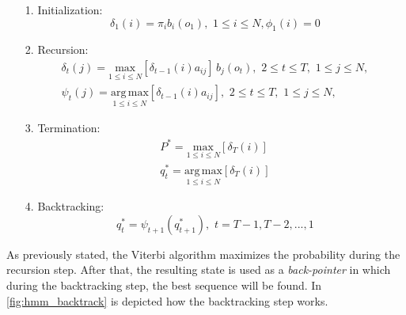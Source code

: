 \begin{itemize}
	\item[1.]{Initialization:} \\
	\begin{equation}
		\delta_{1}(i) = \pi_{i}b_{i}(o_{1}), \,\, 1 \leq i \leq N, \phi_{1}(i) = 0
	\end{equation}		

	\item[2.]{Recursion:} \\
	\begin{subequations}
		\begin{align}
		\delta_{t}(j) = \underset{1\leq i \leq N}{\mathrm{max}} [\delta_{t-1}(i)a_{ij}] \, b_{j}(o_{t}), \,\, 2 \leq t \leq T, \,\, 1 \leq j \leq N, \\
		\psi_{t}(j) = \underset{1\leq i \leq N}{\mathrm{arg \, max}} [\delta_{t-1}(i)a_{ij}], \,\, 2 \leq t \leq T, \,\, 1 \leq j \leq N,
		\end{align}
	\end{subequations}		

	\item[3.]{Termination:} \\
	\begin{subequations}
		\begin{align}
		P^{*} = \underset{1\leq i \leq N}{\mathrm{max}}[\delta_{T}(i)] \\
		q_{t}^{*} = \underset{1\leq i \leq N}{\mathrm{arg \, max}}[\delta_{T}(i)]
		\end{align}
	\end{subequations}

	\item[4.]{Backtracking:} \\
	\begin{equation}
		q_{t}^{*} = \psi_{t+1}(q_{t+1}^{*}), \,\, t = T - 1, T - 2, ... , 1
	\end{equation}
\end{itemize}

\noindent As previously stated, the Viterbi algorithm maximizes the probability during the recursion step. After that, the resulting state is used as a \textit{back-pointer} in which during the backtracking step, the best sequence will be found. In \ref{fig:hmm_backtrack} is depicted how the backtracking step works.


